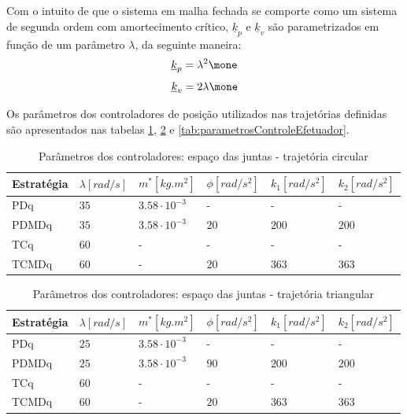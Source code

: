 \documentclass[]{politex}
\begin{document}
Com o intuito de que o sistema em malha fechada se comporte como um sistema de segunda ordem com amortecimento crítico, $\underline{k}_p$ e $\underline{k}_v$ são parametrizados em função de um parâmetro $\lambda$, da seguinte maneira:
\begin{equation}
\underline{k}_p = \lambda^2 \mone
\end{equation}
\begin{equation}
\underline{k}_v = 2 \lambda \mone
\end{equation}

Os parâmetros dos controladores de posição utilizados nas trajetórias definidas são apresentados nas tabelas \ref{tab:parametrosControleAtuadoresCirculo}, \ref{tab:parametrosControleAtuadoresTriangulo} e \ref{tab:parametrosControleEfetuador}.

\begin{table}[H] 
\centering
\caption{Parâmetros dos controladores: espaço das juntas - trajetória circular}
\label{tab:parametrosControleAtuadoresCirculo}
\begin{tabular}{l|l|l|l|l|l}
Estratégia & $\lambda [rad/s]$  & $m^*[kg.m^2]$ & $\phi[rad/s^2]$   & $k_1[rad/s^2]$ & $k_2[rad/s^2]$ \\ \hline
PDq        & $35$               & $3.58 \cdot 10^{-3}$  & -         & -              & -              \\
PDMDq      & $35$               & $3.58 \cdot 10^{-3}$  & $20$      & $200$          & $200$          \\
TCq        & $60$               & -                     & -         & -              & -              \\
TCMDq      & $60$               & -                     & $20$      & $363$          & $363$          \\
\end{tabular}
\end{table}

\begin{table}[H] 
\centering
\caption{Parâmetros dos controladores: espaço das juntas - trajetória triangular}
\label{tab:parametrosControleAtuadoresTriangulo}
\begin{tabular}{l|l|l|l|l|l}
Estratégia & $\lambda [rad/s]$  & $m^*[kg.m^2]$         & $\phi[rad/s^2]$   & $k_1[rad/s^2]$ & $k_2[rad/s^2]$ \\ \hline
PDq        & $25$               & $3.58 \cdot 10^{-3}$  & -         & -              & -              \\
PDMDq      & $25$               & $3.58 \cdot 10^{-3}$  & $90$      & $200$          & $200$          \\
TCq        & $60$               & -                     & -         & -              & -              \\
TCMDq      & $60$               & -                     & $20$      & $363$          & $363$          \\
\end{tabular}
\end{table}
\end{document}
